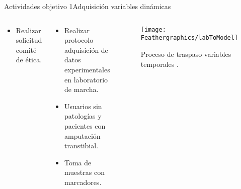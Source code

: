 \documentclass[10pt]{beamer}
\begin{document}
\begin{frame}{Actividades objetivo 1}{Adquisición variables dinámicas}

\begin{columns}[t]


\column{28 mm}
\begin{block}{}

\begin{itemize}
\item {\scriptsize{}Realizar solicitud comité de ética.}{\scriptsize \par}
\end{itemize}
\end{block}

\column{35 mm}
\begin{block}{}

\begin{itemize}
\item {\scriptsize{}Realizar protocolo adquisición de datos experimentales
en laboratorio de marcha.}{\scriptsize \par}
\vspace{5mm}
\item {\scriptsize{}Usuarios sin patologías y pacientes con amputación transtibial.}{\scriptsize \par}
\vspace{5mm}
\item {\scriptsize{}Toma de muestras con marcadores.}{\scriptsize \par}
\end{itemize}
\end{block}

\column{55 mm}
\begin{block}{}
\begin{figure}
\begin{center}
\texttt{[image: Feathergraphics/labToModel]}
\caption{\scriptsize{Proceso de traspaso variables temporales \cite{Seth2011}.}}
\end{center}
\end{figure}

\end{block}
\end{columns}

\end{frame}
\end{document}
